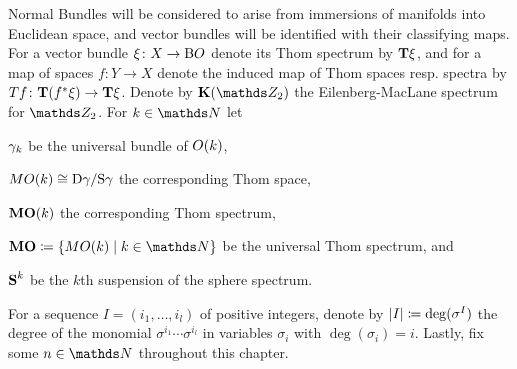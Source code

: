 \begin{Not*}
  Normal Bundles will be considered to arise from immersions of
  manifolds into Euclidean space, and
  vector bundles will be identified with their classifying maps.
  For a vector bundle $\xi\colon X\to\mathrm{B}O$ denote its Thom spectrum by
  $\bm{\mathrm{T}}{\xi}$,
  and for a map of spaces $f\colon Y\to X$ denote the induced map of
  Thom spaces resp. spectra by
  $T{f}\colon\bm{\mathrm{T}}{({f}^*\xi)}\to\bm{\mathrm{T}}{\xi}$.
  Denote by $\EMspec$ the Eilenberg-MacLane spectrum for $\Zmod2$.
  For $k\in\Nat$ let
  \begin{compactitemize}
  \item $\gamma_{k}$ be the universal bundle of $O(k)$, 
  \item $MO(k)\cong\mathrm{D}\gamma_{}/\mathrm{S}\gamma_{}$ the corresponding Thom space,
  \item $\bm{\mathrm{MO}}(k)$ the corresponding Thom spectrum,
  \item $\MOspec\coloneqq\{\MO(k)\mid k\in\Nat\}$ be the universal Thom
    spectrum, and
  \item $\bm{\mathrm{S}}^{k}$ be the $k$th suspension of the sphere spectrum.
  \end{compactitemize}
  For a sequence $I=(i_1,\dotsc,i_l)$ of positive integers, denote by
  $\left|I\right|\coloneqq\deg(\sigma^I)$ the degree of the monomial
  $\sigma^{i_1}\dotsm\sigma^{i_l}$ in variables $\sigma_i$ with
  $\deg(\sigma_i)=i$.
  Lastly, fix some $n\in\Nat$ throughout this chapter.
\end{Not*}


